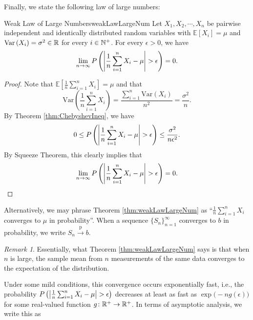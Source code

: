 \documentclass[math, code]{amznotes}
\theoremstyle{remark}
\newtheorem*{remark}{Remark}
\begin{document}
Finally, we state the following law of large numbers:
\begin{thmbox}{Weak Law of Large Numbers}{weakLawLargeNum}
    Let $X_1, X_2, \cdots, X_n$ be pairwise independent and identically distributed random variables with $\mathbb{E}[X_i] = \mu$ and $\mathrm{Var}\left(X_i\right) = \sigma^2 \in \mathbb{R}$ for every $i \in \mathbb{N}^+$. For every $\epsilon > 0$, we have 
    \begin{equation*}
        \lim_{n \to \infty}P\left({\left\lvert {\frac{1}{n}\sum_{i = 1}^nX_i - \mu} \right\rvert} > \epsilon\right) = 0.
    \end{equation*}
    \tcblower
    \begin{proof}
        Note that $\mathbb{E}\left[\frac{1}{n}\sum_{i = 1}^nX_i\right] = \mu$ and that 
        \begin{equation*}
            \mathrm{Var}\left(\frac{1}{n}\sum_{i = 1}^nX_i\right) = \frac{\sum_{i = 1}^{n}\mathrm{Var}\left(X_i\right)}{n^2} = \frac{\sigma^2}{n}.
        \end{equation*}
        By Theorem \ref{thm:ChebyshevIneq}, we have 
        \begin{equation*}
            0 \leq P\left({\left\lvert {\frac{1}{n}\sum_{i = 1}^nX_i - \mu} \right\rvert} > \epsilon\right) \leq \frac{\sigma^2}{n\epsilon^2}.
        \end{equation*}
        By Squeeze Theorem, this clearly implies that 
        \begin{equation*}
            \lim_{n \to \infty}P\left({\left\lvert {\frac{1}{n}\sum_{i = 1}^nX_i - \mu} \right\rvert} > \epsilon\right) = 0.
        \end{equation*}
    \end{proof}
\end{thmbox}
Alternatively, we may phrase Theorem \ref{thm:weakLawLargeNum} as ``$\frac{1}{n}\sum_{i = 1}^nX_i$ converges to $\mu$ in probability''. When a sequence $\{S_n\}_{n = 1}^{\infty}$ converges to $b$ in probability, we write $S_n \xrightarrow{\mathrm{p}} b$. 
\begin{notebox}
    \begin{remark}
        Essentially, what Theorem \ref{thm:weakLawLargeNum} says is that when $n$ is large, the sample mean from $n$ measurements of the same data converges to the expectation of the distribution.
    \end{remark}
\end{notebox}
Under some mild conditions, this convergence occurs exponentially fast, i.e., the probability $P\left({\left\lvert {\frac{1}{n}\sum_{i = 1}^nX_i - \mu} \right\rvert} > \epsilon\right)$ decreases at least as fast as $\exp\bigl(-ng\left(\epsilon\right)\bigr)$ for some real-valued function $g \colon \mathbb{R}^+ \to \mathbb{R}^+$. In terms of asymptotic analysis, we write this as 
\end{document}

